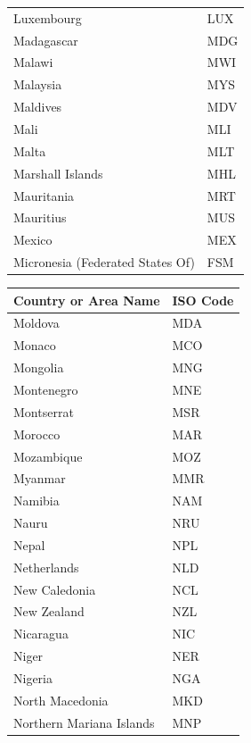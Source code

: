 \documentclass{report}
\begin{document}
\begin{center}
\begin{minipage}{0.46\textwidth}
\begin{tabular}{|p{10.5em}|p{6em}|}
            Luxembourg & LUX\\
            Madagascar & MDG\\
            Malawi & MWI\\
            Malaysia & MYS\\
            Maldives & MDV\\
            Mali & MLI\\
            Malta & MLT\\
            Marshall Islands & MHL\\
            Mauritania & MRT\\
            Mauritius & MUS\\
            Mexico & MEX\\
            Micronesia (Federated States Of) & FSM\\
            \hline
        \end{tabular}
    \end{minipage}
    \hfill
    \begin{minipage}{0.46\textwidth}
        \begin{tabular}{|p{10.5em}|p{6em}|}
            \hline
            Country or Area Name & ISO Code\\
            \hline
            Moldova & MDA\\
            Monaco & MCO\\
            Mongolia & MNG\\
            Montenegro & MNE\\
            Montserrat & MSR\\
            Morocco & MAR\\
            Mozambique & MOZ\\
            Myanmar & MMR\\
            Namibia & NAM\\
            Nauru & NRU\\
            Nepal & NPL\\
            Netherlands & NLD\\
            New Caledonia & NCL\\
            New Zealand & NZL\\
            Nicaragua & NIC\\
            Niger & NER\\
            Nigeria & NGA\\
            North Macedonia & MKD\\
            Northern Mariana Islands & MNP\\

\end{tabular}
\end{minipage}
\end{center}
\end{document}
